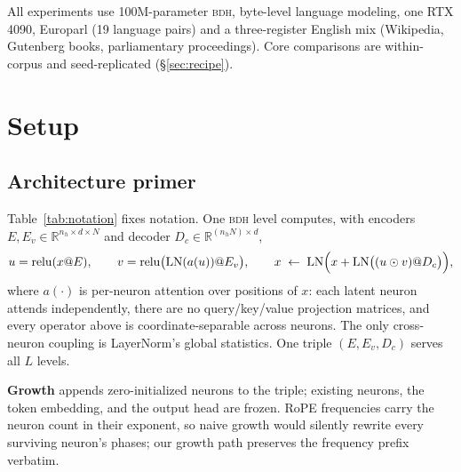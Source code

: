\documentclass[11pt]{article}
\theoremstyle{definition}\newtheorem{definition}{Definition}
\theoremstyle{remark}\newtheorem{remark}{Remark}
\newcommand{\BDH}{\textsc{bdh}}
\begin{document}
All experiments use 100M-parameter \BDH{}, byte-level language modeling, one RTX 4090,
Europarl (19 language pairs) and a three-register English mix (Wikipedia, Gutenberg books,
parliamentary proceedings). Core comparisons are within-corpus and seed-replicated
(\S\ref{sec:recipe}).

\section{Setup}
\label{sec:setup}

\subsection{Architecture primer}\label{sec:primer}

Table~\ref{tab:notation} fixes notation. One \BDH{} level computes, with encoders
$E,E_v\in\mathbb{R}^{n_h\times d\times N}$ and decoder $D_c\in\mathbb{R}^{(n_hN)\times d}$,
\[
u=\operatorname{relu}(x@E),\qquad
v=\operatorname{relu}\bigl(\operatorname{LN}(a(u))@E_v\bigr),\qquad
x \;\leftarrow\; \operatorname{LN}\Bigl(x+\operatorname{LN}\bigl((u\odot v)@D_c\bigr)\Bigr),
\]
where $a(\cdot)$ is per-neuron attention over positions of $x$: each latent neuron attends
independently, there are no query/key/value projection matrices, and every operator above is
coordinate-separable across neurons. The only cross-neuron coupling is LayerNorm's global
statistics. One triple $(E,E_v,D_c)$ serves all $L$ levels.

\textbf{Growth} appends zero-initialized neurons to the triple; existing neurons, the token
embedding, and the output head are frozen. RoPE frequencies carry the neuron count in their
exponent, so naive growth would silently rewrite every surviving neuron's phases; our growth
path preserves the frequency prefix verbatim.
\end{document}
